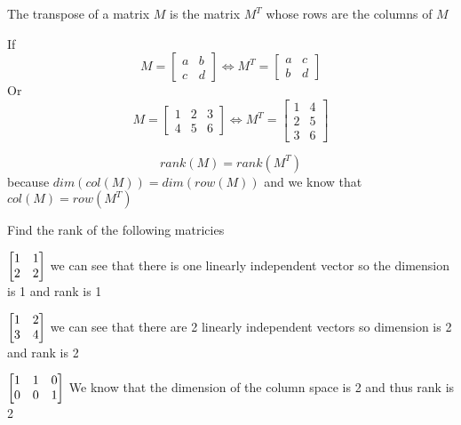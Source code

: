 \documentclass[11pt]{book}
\begin{document}
\begin{defn}\label{defn:transpose_of_a_matrix}
    The transpose of a matrix $M$ is the matrix $M^{T}$ whose rows are the columns of $M$ 
\end{defn}

\begin{eg}
    If 
    \[
    M = 
    \begin{bmatrix}
    	a & b \\
    	c & d 
    \end{bmatrix}
    \Leftrightarrow
    M^{T} = 
    \begin{bmatrix}
    	a & c \\
    	b & d 
    \end{bmatrix}
    \]
    Or 
    \[
    M = 
    \begin{bmatrix}
    	1 & 2 & 3 \\
    	4 & 5 & 6 
    \end{bmatrix}
    \Leftrightarrow
    M^{T} = 
    \begin{bmatrix}
    	1 & 4 \\
    	2 & 5 \\
    	3 & 6 
    \end{bmatrix}
    \]
\end{eg}

\begin{crly}
    \[
    rank\left(M\right) = rank\left(M^{T}\right)
    \]
    because $dim\left(col\left(M\right)\right) = dim\left(row\left(M\right)\right)$ and we know that $col\left(M\right) = row\left(M^{T}\right)$ 
\end{crly}

Find the rank of the following matricies
\begin{ex}
    $\begin{bmatrix} 1 & 1 \\ 2 & 2 \end{bmatrix}$ we can see that there is one linearly independent vector so the dimension is 1 and rank is 1
\end{ex}

\begin{ex}
    $\begin{bmatrix} 1 & 2 \\ 3 & 4 \end{bmatrix}$ we can see that there are 2 linearly independent vectors so dimension is 2 and rank is 2
\end{ex}

\begin{ex}
    $\begin{bmatrix} 1 & 1 & 0 \\ 0 & 0 & 1 \end{bmatrix}$ We know that the dimension of the column space is 2 and thus rank is 2
\end{ex}
\end{document}
